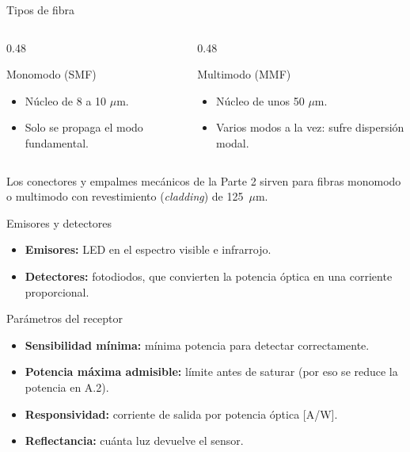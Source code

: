 \documentclass[aspectratio=169,10pt]{beamer}
\begin{document}
\begin{frame}{Tipos de fibra}
  \begin{columns}[T]
    \begin{column}{0.48\textwidth}
      \begin{block}{Monomodo (SMF)}
        \begin{itemize}
          \item Núcleo de 8 a 10 $\mu$m.
          \item Solo se propaga el modo fundamental.
        \end{itemize}
      \end{block}
    \end{column}
    \begin{column}{0.48\textwidth}
      \begin{block}{Multimodo (MMF)}
        \begin{itemize}
          \item Núcleo de unos 50 $\mu$m.
          \item Varios modos a la vez: sufre dispersión modal.
        \end{itemize}
      \end{block}
    \end{column}
  \end{columns}

  \bigskip
  Los conectores y empalmes mecánicos de la Parte 2 sirven para fibras monomodo o multimodo con revestimiento (\emph{cladding}) de 125~$\mu$m.
\end{frame}

\begin{frame}{Emisores y detectores}
  \begin{itemize}
    \item \textbf{Emisores:} LED en el espectro visible e infrarrojo.
    \item \textbf{Detectores:} fotodiodos, que convierten la potencia óptica en una corriente proporcional.
  \end{itemize}

  \medskip
  \begin{block}{Parámetros del receptor}
    \begin{itemize}
      \item \textbf{Sensibilidad mínima:} mínima potencia para detectar correctamente.
      \item \textbf{Potencia máxima admisible:} límite antes de {saturar} (por eso se reduce la potencia en A.2).
      \item \textbf{Responsividad:} corriente de salida por potencia óptica [A/W].
      \item \textbf{Reflectancia:} cuánta luz devuelve el sensor.
    \end{itemize}
  \end{block}
\end{frame}
\end{document}

